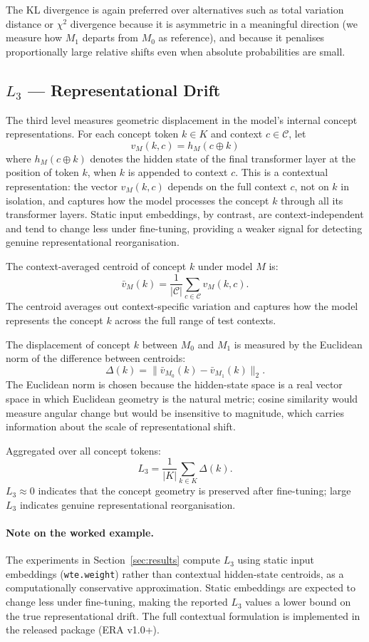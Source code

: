 \documentclass[11pt,a4paper]{article}
\begin{document}
The KL divergence is again preferred over alternatives such as total variation distance or
$\chi^2$ divergence because it is asymmetric in a meaningful direction (we measure how
$M_1$ departs from $M_0$ as reference), and because it penalises proportionally large
relative shifts even when absolute probabilities are small.

\subsection{\texorpdfstring{$L_3$}{L3} --- Representational Drift}
\label{sec:l3}

The third level measures geometric displacement in the model's internal concept
representations. For each concept token $k \in K$ and context $c \in \mathcal{C}$, let
\[
  v_M(k, c) = h_M(c \oplus k)
\]
where $h_M(c \oplus k)$ denotes the hidden state of the final transformer layer at the
position of token $k$, when $k$ is appended to context $c$. This is a contextual
representation: the vector $v_M(k, c)$ depends on the full context $c$, not on $k$ in
isolation, and captures how the model processes the concept $k$ through all its transformer
layers. Static input embeddings, by contrast, are context-independent and tend to change
less under fine-tuning, providing a weaker signal for detecting genuine representational
reorganisation.

The context-averaged centroid of concept $k$ under model $M$ is:
\[
  \bar{v}_M(k)
  = \frac{1}{|\mathcal{C}|} \sum_{c \in \mathcal{C}} v_M(k, c).
\]
The centroid averages out context-specific variation and captures how the model represents
the concept $k$ across the full range of test contexts.

The displacement of concept $k$ between $M_0$ and $M_1$ is measured by the Euclidean
norm of the difference between centroids:
\[
  \Delta(k) = \|\bar{v}_{M_0}(k) - \bar{v}_{M_1}(k)\|_2.
\]
The Euclidean norm is chosen because the hidden-state space is a real vector space in which
Euclidean geometry is the natural metric; cosine similarity would measure angular change
but would be insensitive to magnitude, which carries information about the scale of
representational shift.

Aggregated over all concept tokens:
\[
  L_3 = \frac{1}{|K|} \sum_{k \in K} \Delta(k).
\]
$L_3 \approx 0$ indicates that the concept geometry is preserved after fine-tuning; large
$L_3$ indicates genuine representational reorganisation.

\paragraph{Note on the worked example.}
The experiments in Section~\ref{sec:results} compute $L_3$ using static input embeddings
(\texttt{wte.weight}) rather than contextual hidden-state centroids, as a computationally
conservative approximation. Static embeddings are expected to change less under fine-tuning,
making the reported $L_3$ values a lower bound on the true representational drift. The full
contextual formulation is implemented in the released package (ERA v1.0+).
\end{document}
